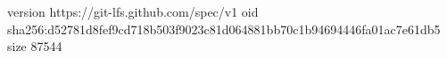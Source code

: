 version https://git-lfs.github.com/spec/v1
oid sha256:d52781d8fef9cd718b503f9023c81d064881bb70c1b94694446fa01ac7e61db5
size 87544
